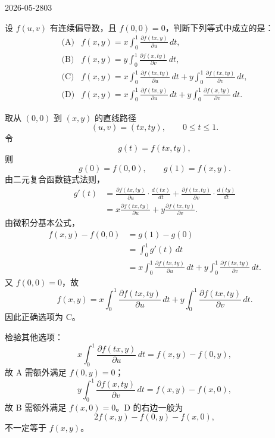 \begin{mistake}{2026-05-28}{03}

\begin{problemcontent}
设 \(f(u,v)\) 有连续偏导数，且 \(f(0,0)=0\)，判断下列等式中成立的是：
\[
\begin{array}{ll}
\text{(A)} & f(x,y)=x\displaystyle\int_0^1 \frac{\partial f(tx,y)}{\partial u}\,dt,\\[8pt]
\text{(B)} & f(x,y)=y\displaystyle\int_0^1 \frac{\partial f(x,ty)}{\partial v}\,dt,\\[8pt]
\text{(C)} & f(x,y)=x\displaystyle\int_0^1 \frac{\partial f(tx,ty)}{\partial u}\,dt+y\displaystyle\int_0^1 \frac{\partial f(tx,ty)}{\partial v}\,dt,\\[8pt]
\text{(D)} & f(x,y)=x\displaystyle\int_0^1 \frac{\partial f(tx,y)}{\partial u}\,dt+y\displaystyle\int_0^1 \frac{\partial f(x,ty)}{\partial v}\,dt.
\end{array}
\]
\end{problemcontent}

\begin{solutioncontent}
取从 \((0,0)\) 到 \((x,y)\) 的直线路径
\[
(u,v)=(tx,ty),\qquad 0\leq t\leq 1.
\]
令
\[
g(t)=f(tx,ty),
\]
则
\[
g(0)=f(0,0),\qquad g(1)=f(x,y).
\]
由二元复合函数链式法则，
\[
\begin{aligned}
g'(t)
&=\frac{\partial f(tx,ty)}{\partial u}\cdot \frac{d(tx)}{dt}
+\frac{\partial f(tx,ty)}{\partial v}\cdot \frac{d(ty)}{dt}\\
&=x\frac{\partial f(tx,ty)}{\partial u}
+y\frac{\partial f(tx,ty)}{\partial v}.
\end{aligned}
\]
由微积分基本公式，
\[
\begin{aligned}
f(x,y)-f(0,0)
&=g(1)-g(0)\\
&=\int_0^1 g'(t)\,dt\\
&=x\int_0^1 \frac{\partial f(tx,ty)}{\partial u}\,dt
+y\int_0^1 \frac{\partial f(tx,ty)}{\partial v}\,dt.
\end{aligned}
\]
又 \(f(0,0)=0\)，故
\[
f(x,y)=x\int_0^1 \frac{\partial f(tx,ty)}{\partial u}\,dt
+y\int_0^1 \frac{\partial f(tx,ty)}{\partial v}\,dt.
\]
因此正确选项为 \(\mathrm{C}\)。

检验其他选项：
\[
x\int_0^1 \frac{\partial f(tx,y)}{\partial u}\,dt=f(x,y)-f(0,y),
\]
故 A 需额外满足 \(f(0,y)=0\)；
\[
y\int_0^1 \frac{\partial f(x,ty)}{\partial v}\,dt=f(x,y)-f(x,0),
\]
故 B 需额外满足 \(f(x,0)=0\)。D 的右边一般为
\[
2f(x,y)-f(0,y)-f(x,0),
\]
不一定等于 \(f(x,y)\)。
\end{solutioncontent}


\end{mistake}
